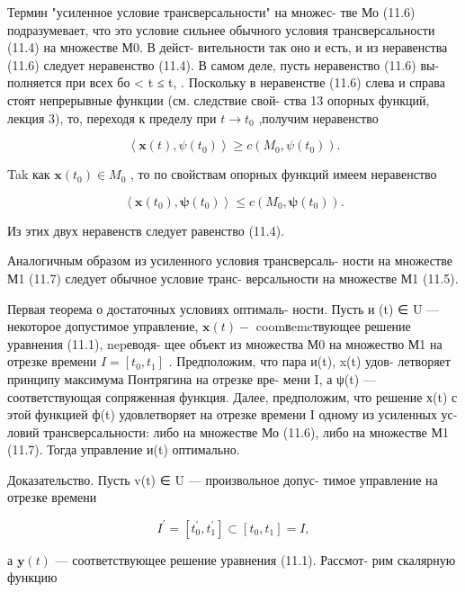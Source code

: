 \documentclass[8pt]{extarticle}
\begin{document}
Термин "усиленное условие трансверсальности" на множес- тве Мо (11.6) подразумевает, что это условие сильнее обычного условия трансверсальности (11.4) на множестве М0. В дейст- вительности так оно и есть, и из неравенства (11.6) следует неравенство (11.4). В самом деле, пусть неравенство (11.6) вы- полняется при всех бо < t ≤ t, . Поскольку в неравенстве (11.6) слева и справа стоят непрерывные функции (см. следствие свой- ства 13 опорных функций, лекция 3), то, переходя к пределу при \(t \rightarrow  {t}_{0}\) ,получим неравенство

\[
\left\langle  {\mathbf{x}\left( t\right) ,\psi \left( {t}_{0}\right) }\right\rangle   \geq  c\left( {{M}_{0},\psi \left( {t}_{0}\right) }\right) .
\]

Tak как \(\mathbf{x}\left( {t}_{0}\right)  \in  {M}_{0}\) , то по свойствам опорных функций имеем неравенство

\[
\left\langle  {\mathbf{x}\left( {t}_{0}\right) ,\mathbf{\psi }\left( {t}_{0}\right) }\right\rangle   \leq  c\left( {{M}_{0},\mathbf{\psi }\left( {t}_{0}\right) }\right) .
\]

Из этих двух неравенств следует равенство (11.4).

Аналогичным образом из усиленного условия трансверсаль- ности на множестве М1 (11.7) следует обычное условие транс- версальности на множестве М1 (11.5).

Первая теорема о достаточных условиях оптималь- ности. Пусть и (t) ∈ U — некоторое допустимое управление, \(\mathbf{x}\left( t\right)  -\) coomвemcтвующее решение уравнения (11.1), nepеводя- щее объект из множества М0 на множество М1 на отрезке времени \(I = \left\lbrack  {{t}_{0},{t}_{1}}\right\rbrack\) . Предположим, что пара и(t), x(t) удов- летворяет принципу максимума Понтрягина на отрезке вре- мени I, а ψ(t) — соответствующая сопряженная функция. Далее, предположим, что решение х(t) с этой функцией ф(t) удовлетворяет на отрезке времени I одному из усиленных ус- ловий трансверсальности: либо на множестве Мо (11.6), либо на множестве М1 (11.7). Тогда управление и(t) оптимально.

Доказательство. Пусть v(t) ∈ U — произвольное допус- тимое управление на отрезке времени

\[
{I}^{\prime } = \left\lbrack  {{t}_{0}^{\prime },{t}_{1}^{\prime }}\right\rbrack   \subset  \left\lbrack  {{t}_{0},{t}_{1}}\right\rbrack   = I,
\]

а \(\mathbf{y}\left( t\right)\) — соответствующее решение уравнения (11.1). Рассмот- рим скалярную функцию
\end{document}
